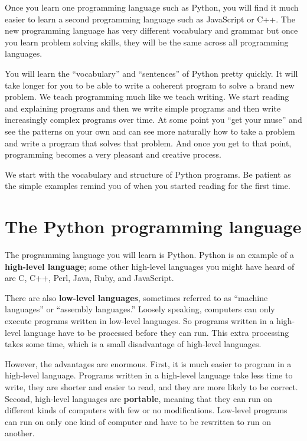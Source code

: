 \documentclass[10pt]{book}
\begin{document}
Once you learn one programming language such as Python, you will 
find it much easier to learn a second programming language such
as JavaScript or C++.  The new programming language has very different 
vocabulary and grammar but once you learn problem solving skills, 
they will be the same across all programming languages.

You will learn the ``vocabulary'' and ``sentences'' of Python pretty quickly.
It will take longer for you to be able to write a coherent program
to solve a brand new problem.  We teach programming much like we teach
writing.  We start reading and explaining programs and then we write 
simple programs and then write increasingly complex programs over time.
At some point you ``get your muse'' and see the patterns on your own
and can see more naturally how to take a problem and 
write a program that solves that problem.  And once you get 
to that point, programming becomes a very pleasant and creative process.  

We start with the vocabulary and structure of Python programs.  Be patient
as the simple examples remind you of when you started reading for the first
time. 

\section{The Python programming language}

The programming language you will learn is Python. Python is
an example of a {\bf high-level language}; some other high-level languages
you might have heard of are C, C++, Perl, Java, Ruby, and JavaScript. 

There are
also {\bf low-level languages}, sometimes referred to as ``machine
languages'' or ``assembly languages.''  Loosely speaking, computers
can only execute programs written in low-level languages.  So
programs written in a high-level language have to be processed before
they can run.  This extra processing takes some time, which is a small
disadvantage of high-level languages.


However, the advantages are enormous.  First, it is much easier to program
in a high-level language.  Programs written in a high-level language
take less time to write, they are shorter and easier to read, and they
are more likely to be correct.  Second, high-level languages are {\bf
portable}, meaning that they can run on different kinds of computers
with few or no modifications.  Low-level programs can run on only one
kind of computer and have to be rewritten to run on another.
\end{document}
